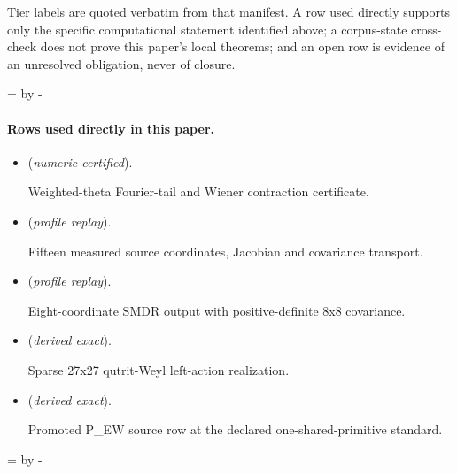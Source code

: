 \documentclass[11pt]{article}
\begin{document}
Tier labels are quoted verbatim from that manifest. A row used directly supports only the specific computational statement identified above; a corpus-state cross-check does not prove this paper's local theorems; and an open row is evidence of an unresolved obligation, never of closure.

\par\begingroup{}=\pagegoal\advance{} by -\pagetotal\ifdim\dimen0<7\baselineskip\newpage\fi\endgroup
\paragraph{Rows used directly in this paper.}
\begin{itemize}
\setlength{\itemsep}{0.25em}
\item {} (\emph{numeric certified}).\par Weighted-theta Fourier-tail and Wiener contraction certificate.
\item {} (\emph{profile replay}).\par Fifteen measured source coordinates, Jacobian and covariance transport.
\item {} (\emph{profile replay}).\par Eight-coordinate SMDR output with positive-definite 8x8 covariance.
\item {} (\emph{derived exact}).\par Sparse 27x27 qutrit-Weyl left-action realization.
\item {} (\emph{derived exact}).\par Promoted P\_EW source row at the declared one-shared-primitive standard.
\end{itemize}

\par\begingroup{}=\pagegoal\advance{} by -\pagetotal\ifdim\dimen0<7\baselineskip\newpage\fi\endgroup
\end{document}
